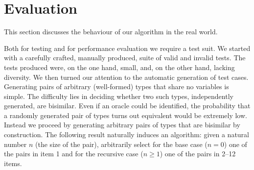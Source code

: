 \section{Evaluation}
\label{sec:evaluation}

This section discusses the behaviour of our algorithm in the real
world.

Both for testing and for performance evaluation we require a test
suit. We started with a carefully crafted, manually produced, suite of
valid and invalid tests. The tests produced were, on the one hand,
small, and, on the other hand, lacking diversity. We then turned our
attention to the automatic generation of test cases. Generating pairs
of arbitrary (well-formed) types that share no variables is
simple. The difficulty lies in deciding whether two such types,
independently generated, are bisimilar. Even if an oracle could be
identified, the probability that a randomly generated pair of types
turns out equivalent would be extremely low. Instead we proceed by
generating arbitrary pairs of types that are bisimilar by
construction. The following result naturally induces an algorithm:
given a natural number $n$ (the size of the pair), arbitrarily select
for the base case ($n=0$) one of the pairs in item 1 and for the
recursive case ($n\ge1$) one of the pairs in 2--12 items.

